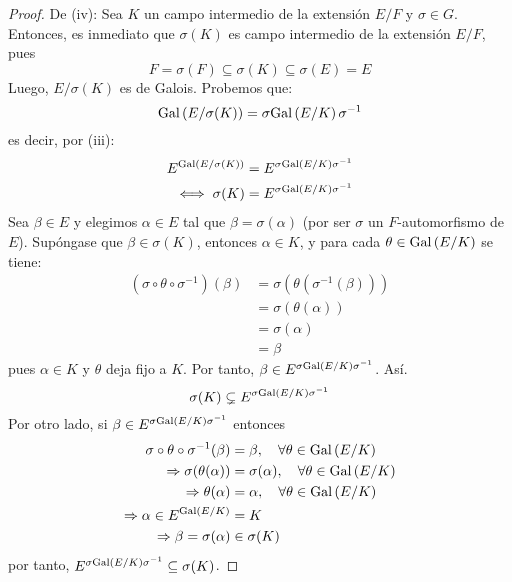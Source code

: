 \documentclass[12pt]{report}
\theoremstyle{largebreak}
\begin{document}
\begin{proof}
        De (iv): Sea $K$ un campo intermedio de la extensión $E/F$ y $\sigma\in G$. Entonces, es inmediato que $\sigma(K)$ es campo intermedio de la extensión $E/F$, pues
        \begin{equation*}
            F=\sigma(F)\subseteq\sigma(K)\subseteq\sigma(E)=E
        \end{equation*}
        Luego, $E/\sigma(K)$ es de Galois. Probemos que:
        \begin{equation*}
            \textup{Gal}\left(E/\sigma(K)\right)=\sigma\textup{Gal}\left(E/K\right)\sigma^{-1}
        \end{equation*}
        es decir, por (iii):
        \begin{equation*}
            \begin{split}
                E^{\textup{Gal}\left(E/\sigma(K)\right)}&=E^{\sigma\textup{Gal}\left(E/K\right)\sigma^{-1}}\\
                \iff \sigma(K)&=E^{\sigma\textup{Gal}\left(E/K\right)\sigma^{-1}}\\
            \end{split}
        \end{equation*}
        Sea $\beta\in E$ y elegimos $\alpha\in E$ tal que $\beta=\sigma(\alpha)$ (por ser $\sigma$ un $F$-automorfismo de $E$). Supóngase que $\beta\in\sigma(K)$, entonces $\alpha\in K$, y para cada $\theta\in\textup{Gal}\left(E/K\right)$ se tiene:
        \begin{equation*}
            \begin{split}
                (\sigma\circ\theta\circ\sigma^{-1})(\beta)&=\sigma(\theta(\sigma^{-1}(\beta)))\\
                &=\sigma(\theta(\alpha))\\
                &=\sigma(\alpha)\\
                &=\beta
            \end{split}
        \end{equation*}
        pues $\alpha\in K$ y $\theta$ deja fijo a $K$. Por tanto, $\beta\in E^{\sigma\textup{Gal}\left(E/K\right)\sigma^{-1}}$. Así.
        \begin{equation*}
            \sigma(K)\subsetneq E^{\sigma\textup{Gal}\left(E/K\right)\sigma^{-1}}
        \end{equation*}
        Por otro lado, si $\beta\in E^{\sigma\textup{Gal}\left(E/K\right)\sigma^{-1}}$ entonces
        \begin{equation*}
            \begin{split}
                \sigma\circ\theta\circ\sigma^{-1}(\beta)&=\beta,\quad\forall \theta\in\textup{Gal}\left(E/K\right)\\
                \Rightarrow \sigma(\theta(\alpha))&=\sigma(\alpha),\quad\forall \theta\in\textup{Gal}\left(E/K\right)\\
                \Rightarrow \theta(\alpha)&=\alpha,\quad\forall\theta\in\textup{Gal}\left(E/K\right)\\
                \Rightarrow \alpha\in E^{\textup{Gal}\left(E/K\right)}&=K\\
                \Rightarrow \beta=\sigma(\alpha)&\in\sigma(K)\\
            \end{split}
        \end{equation*}
        por tanto, $E^{\sigma\textup{Gal}\left(E/K\right)\sigma^{-1}}\subseteq \sigma(K)$.


\end{proof}
\end{document}
